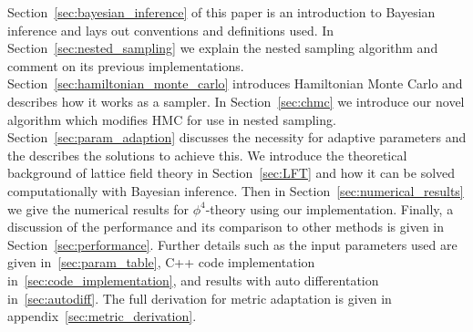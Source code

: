 \documentclass[11pt]{article}
\begin{document}
    Section~\ref{sec:bayesian_inference} of this paper is an introduction to Bayesian inference and lays out conventions
    and definitions used.
    In Section~\ref{sec:nested_sampling} we explain the nested sampling algorithm and comment on its
    previous implementations.
    Section~\ref{sec:hamiltonian_monte_carlo} introduces Hamiltonian Monte Carlo and describes how it works as a sampler.
    In Section~\ref{sec:chmc} we introduce our novel algorithm which modifies HMC for use in nested sampling.
    Section~\ref{sec:param_adaption} discusses the necessity for adaptive parameters and the describes the solutions
    to achieve this.
    We introduce the theoretical background of lattice field theory in Section~\ref{sec:LFT} and how it can be
    solved computationally with Bayesian inference.
    Then in Section~\ref{sec:numerical_results} we give the numerical results for $\phi^4$-theory
    using our implementation.
    Finally, a discussion of the performance and its comparison to other methods is given in Section~\ref{sec:performance}.
    Further details such as the input parameters used are given in~\cref{sec:param_table},
    C++ code implementation in~\cref{sec:code_implementation}, and results with auto differentation in~\cref{sec:autodiff}.
    The full derivation for metric adaptation is given in appendix~\ref{sec:metric_derivation}.
\end{document}
